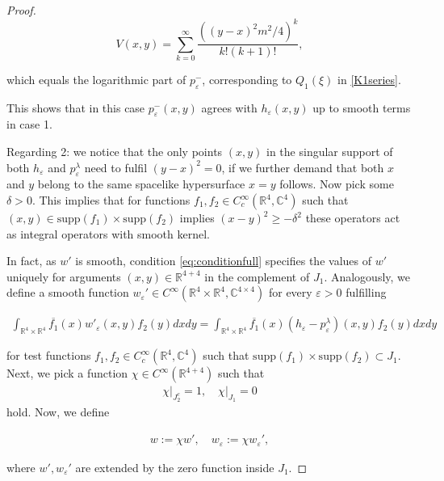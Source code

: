 \documentclass[a4paper,11pt]{article}
\begin{document}
\begin{proof}
\begin{equation}
V(x,y)=\sum_{k=0}^\infty \frac{( (y-x)^2m^2/4)^k}{k! (k+1)!},
\end{equation}

which equals the logarithmic part of \(p^-_\varepsilon\), corresponding to \(Q_1(\xi)\) in \eqref{K1series}. 

This shows that in this case
\(p_\varepsilon^-(x,y)\) agrees with \(h_\varepsilon(x,y)\) up to smooth terms in case 1.
 
Regarding 2: we notice that the only points \((x,y)\) in the singular support  of both \(h_\varepsilon\) and \(p_\varepsilon^{\lambda}\) need to fulfil
\((y-x)^2=0\), if we further demand that both \(x\) and \(y\) belong to the same spacelike hypersurface \(x=y\) follows. 
Now pick some \(\delta>0\).
This implies that for functions \(f_1,f_2\in C_c^\infty(\mathbb{R}^4,\mathbb{C}^4)\) such that \((x,y)\in \mathrm{supp}(f_1)\times\mathrm{supp}(f_2)\) 
implies \((x-y)^2\ge -\delta^2\) these operators act as integral operators with smooth kernel.


In fact, as \(w'\) is smooth, condition \eqref{eq:conditionfull} specifies the values of \(w'\)
uniquely for arguments \((x,y)\in\mathbb{R}^{4+4}\) in the complement of \(J_1\).
Analogously, we define a smooth function \(w_\varepsilon' \in C^\infty(\mathbb{R}^4\times\mathbb{R}^4,\mathbb{C}^{4\times 4})\) for
every \(\varepsilon>0\) fulfilling 

\begin{align}\label{eq:wepsilon_condition}
\int_{\mathbb{R}^4\times\mathbb{R}^4} \overline{f_1}(x) w'_\varepsilon(x,y) f_2(y)dxdy =
\int_{\mathbb{R}^4\times\mathbb{R}^4} \overline{f_1}(x) (h_\varepsilon - p_\varepsilon^\lambda)(x,y) f_2(y)dxdy
\end{align}

for test functions \(f_1,f_2\in C^\infty_c(\mathbb{R}^4,\mathbb{C}^4)\) such that \(\mathrm{supp}(f_1)\times \mathrm{supp}(f_2)\subset J_1\).
Next, we pick a function \(\chi\in C^\infty(\mathbb{R}^{4+4})\) such that 
\begin{align}
\left.\chi \right|_{J_2^c}=1, \quad \left. \chi \right|_{J_1}=0
\end{align}
hold. Now, we define

\begin{align}
w:=\chi w',\quad w_\varepsilon:= \chi w_\varepsilon',
\end{align}

where \(w',w_{\varepsilon}'\) are extended by the zero function inside \(J_1\).


\end{proof}
\end{document}
